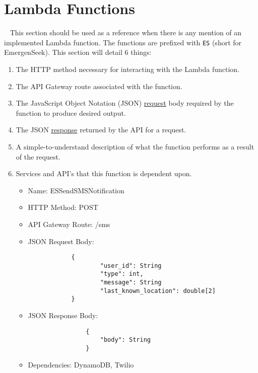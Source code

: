 \documentclass[10pt, a4paper]{article}
\begin{document}
\section{Lambda Functions}
\par ~ This section should be used as a reference when there is any mention of an implemented Lambda function. The functions are prefixed with \texttt{ES} (short for EmergenSeek). This section will detail 6 things:
	\begin{enumerate}
		\item[1.] The HTTP method necessary for interacting with the Lambda function.
		\item[2.] The API Gateway route associated with the function.
		\item[3.] The JavaScript Object Notation (JSON) \underline{request} body required by the function to produce desired output.
		\item[4.] The JSON \underline{response} returned by the API for a request.
		\item[5.] A simple-to-understand description of what the function performs as a result of the request.
		\item[6.] Services and API's that this function is dependent upon.
	
	\begin{itemize}		
		\item[(i)] Name: ESSendSMSNotification
		\item[(ii)] HTTP Method: POST
		\item[(iii)] API Gateway Route: /sms
		\item[(iv)] JSON Request Body:
			\begin{verbatim}
			{
			    	"user_id": String
    				"type": int,
    				"message": String
    				"last_known_location": double[2]
    		}
			\end{verbatim}
		\item[(v)] JSON Response Body:
			\begin{verbatim}
				{
			    	"body": String
       			}
			\end{verbatim}
		\item[(vi)] Dependencies: DynamoDB, Twilio
	\end{itemize}
	\end{enumerate}
\end{document}
